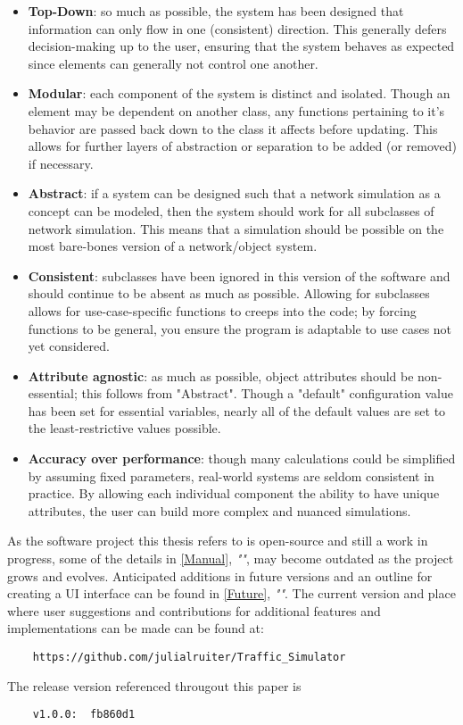 \begin{itemize}
  \item \textbf{Top-Down}:  so much as possible, the system has been designed that information can only flow in one (consistent) direction.  This generally defers decision-making up to the user, ensuring that the system behaves as expected since elements can generally not control one another. 
  \item \textbf{Modular}:  each component of the system is distinct and isolated.  Though an element may be dependent on another class, any functions pertaining to it's behavior are passed back down to the class it affects before updating.  This allows for further layers of abstraction or separation to be added (or removed) if necessary.
  \item \textbf{Abstract}:  if a system can be designed such that a network simulation as a concept can be modeled, then the system should work for all subclasses of network simulation.  This means that a simulation should be possible on the most bare-bones version of a network/object system.
  \item  \textbf{Consistent}:  subclasses have been ignored in this version of the software and should continue to be absent as much as possible.  Allowing for subclasses allows for use-case-specific functions to creeps into the code; by forcing functions to be general, you ensure the program is adaptable to use cases not yet considered.
  \item \textbf{Attribute agnostic}:  as much as possible, object attributes should be non-essential; this follows from "Abstract".  Though a "default" configuration value has been set for essential variables, nearly all of the default values are set to the least-restrictive values possible.
  \item \textbf{Accuracy over performance}:  though many calculations could be simplified by assuming fixed parameters, real-world systems are seldom consistent in practice.  By allowing each individual component the ability to have unique attributes, the user can build more complex and nuanced simulations.
\end{itemize}


\par As the software project this thesis refers to is open-source and still a work in progress, some of the details in \autoref{Manual}, \textit{""}, may become outdated as the project grows and evolves.  Anticipated additions in future versions and an outline for creating a UI interface can be found in \autoref{Future}, \textit{""}.  The current version and place where user suggestions and contributions for additional features and implementations can be made can be found at:  
\begin{verbatim}
    https://github.com/julialruiter/Traffic_Simulator
\end{verbatim}

\noindent The release version referenced througout this paper is 
\begin{verbatim}
    v1.0.0:  fb860d1
\end{verbatim}

